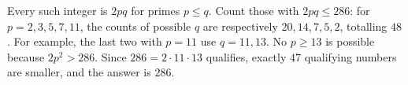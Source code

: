 Every such integer is $2pq$ for primes $p\le q$. Count those with $2pq\le286$: for $p=2,3,5,7,11$, the counts of possible $q$ are respectively $20,14,7,5,2$, totalling $48$. For example, the last two with $p=11$ use $q=11,13$. No $p\ge13$ is possible because $2p^2>286$. Since $286=2\cdot11\cdot13$ qualifies, exactly $47$ qualifying numbers are smaller, and the answer is $\boxed{286}$.
